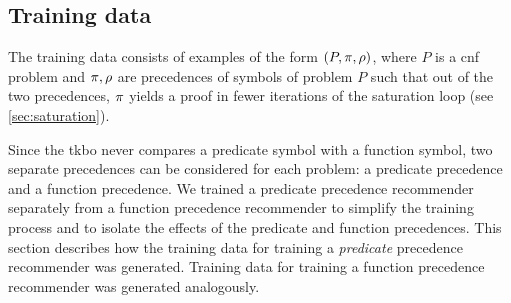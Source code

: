 


\subsection{Training data}

The training data consists of examples of the form $(P, \pi, \rho)$,
where $P$ is a \gls{cnf} problem and $\pi, \rho$ are precedences of symbols of problem $P$
such that out of the two precedences, $\pi$ yields a proof in fewer iterations of the saturation loop (see \cref{sec:saturation}).

Since the \gls{tkbo} never compares a predicate symbol with a function symbol,
two separate precedences can be considered for each problem:
a predicate precedence and a function precedence.
We trained a predicate precedence recommender separately from a function precedence recommender
to simplify the training process and to isolate the effects of the predicate and function precedences.
This section describes how the training data for training a \emph{predicate} precedence recommender was generated.
Training data for training a function precedence recommender was generated analogously.

